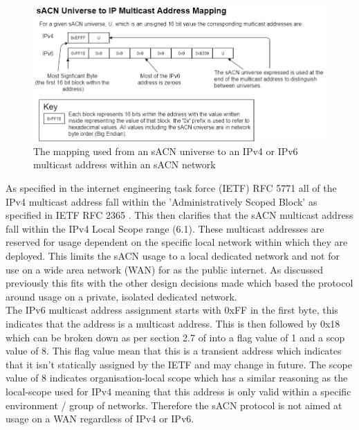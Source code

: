\documentclass[11pt,a4paper]{article}
\begin{document}
\begin{figure}[H]
	\includegraphics[width=\textwidth]{IpMulticastMapping}
	\caption{The mapping used from an sACN universe to an IPv4 or IPv6 multicast address within an sACN network}
	\label{UNI_IP_MAPPING}
\end{figure}

As specified in the internet engineering task force (IETF) RFC 5771 \cite{IETF_RFC_5771} all of the IPv4 multicast address fall within the 'Administratively Scoped Block' as specified in IETF RFC 2365 \cite{IETF_RFC_2365}. This then clarifies that the sACN multicast address fall within the IPv4 Local Scope range (6.1). These multicast addresses are reserved for usage dependent on the specific local network within which they are deployed. This limits the sACN usage to a local dedicated network and not for use on a wide area network (WAN) for as the public internet. As discussed previously this fits with the other design decisions made which based the protocol around usage on a private, isolated dedicated network.\\

The IPv6 multicast address assignment starts with 0xFF in the first byte, this indicates that the address is a multicast address. This is then followed by 0x18 which can be broken down as per section 2.7 of \cite{IETF_RFC_4291} into a flag value of 1 and a scop value of 8. This flag value mean that this is a transient address which indicates that it isn't statically assigned by the IETF and may change in future. The scope value of 8 indicates organisation-local scope which has a similar reasoning as the local-scope used for IPv4 meaning that this address is only valid within a specific environment / group of networks. Therefore the sACN protocol is not aimed at usage on a WAN regardless of IPv4 or IPv6. 
\end{document}
